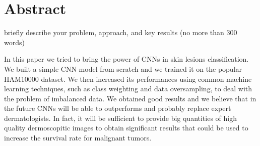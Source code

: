 \chapter*{Abstract}
briefly describe your problem, approach, and key results (no more than 300 words) 

In this paper we tried to bring the power of CNNs in skin lesions classification. We built a simple CNN model from scratch and we trained it on the popular HAM10000\cite{article4} dataset. We then increased its performances using common machine learning techniques, such as class weighting and data oversampling, to deal with the problem of imbalanced data. We obtained good results and we believe that in the future CNNs will be able to outperforms and probably replace expert dermatologists. In fact, it will be sufficient to provide big quantities of high quality dermoscopitic images to obtain significant results that could be used to increase the survival rate for malignant tumors.

